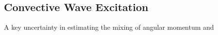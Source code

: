 {\color{purple}
\subsection{Convective Wave Excitation}
}

A key uncertainty in estimating the mixing of angular momentum and 
